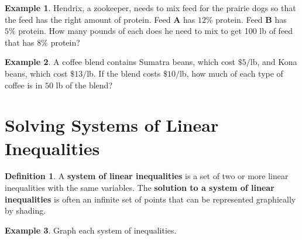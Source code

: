 \documentclass{report}
\theoremstyle{definition}
\newtheorem{example}{\bf Example}
\newtheorem{definition}{\bf Definition}[section]
\begin{document}
\begin{example}
Hendrix, a zookeeper, needs to mix feed for the prairie dogs so that the feed has the right amount of protein. Feed \textbf{A} has $12\%$ protein. Feed \textbf{B} has $5\%$ protein. How many pounds of each does he need to mix to get 100 lb of feed that has $8\%$ protein?
\end{example} 
\vfill

\begin{example}
A coffee blend contains Sumatra beans, which cost $\$5/$lb, and Kona beans, which cost $\$13/$lb. If the blend costs $\$10/$lb, how much of each type of coffee is in $50$ lb of the blend? 
\end{example}
\vfill



 \noindent{}



 \section{Solving Systems of Linear Inequalities}
 \setcounter{example}{0}
 \setcounter{definition}{0}
\begin{definition}
	A \textbf{system of linear inequalities} is a set of two or more linear inequalities with the same variables. The \textbf{solution to a system of linear inequalities} is often an infinite set of points that can be represented graphically by shading.
\end{definition}
\begin{example}
Graph each system of inequalities.
\end{example}
\end{document}
